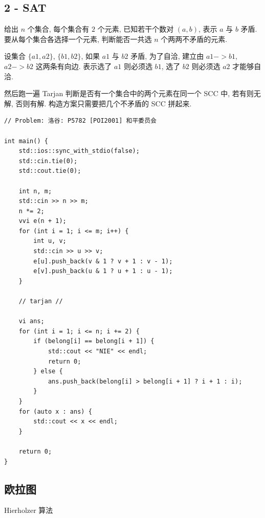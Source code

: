 \documentclass[UTF8, a4paper, titlepage, twoside]{ctexart}
\begin{document}
\subsection{ 2 - SAT }
给出 $n$ 个集合, 每个集合有 $2$ 个元素, 已知若干个数对 $(a, b)$, 表示 $a$ 与 $b$ 矛盾. 要从每个集合各选择一个元素, 判断能否一共选 $n$ 个两两不矛盾的元素. 

设集合 $\{a1, a2\}$, $\{b1, b2\}$, 如果 $a1$ 与 $b2$ 矛盾, 为了自洽, 建立由 $a1 -> b1$, $a2 -> b2$ 这两条有向边. 表示选了 $a1$ 则必须选 $b1$, 选了 $b2$ 则必须选 $a2$ 才能够自洽.

然后跑一遍 Tarjan 判断是否有一个集合中的两个元素在同一个 SCC 中, 若有则无解, 否则有解. 构造方案只需要把几个不矛盾的 SCC 拼起来.

\begin{lstlisting}[style=cpp]
// Problem: 洛谷: P5782 [POI2001] 和平委员会

int main() {
    std::ios::sync_with_stdio(false);
    std::cin.tie(0);
    std::cout.tie(0);

    int n, m;
    std::cin >> n >> m;
    n *= 2;
    vvi e(n + 1);
    for (int i = 1; i <= m; i++) {
        int u, v;
        std::cin >> u >> v;
        e[u].push_back(v & 1 ? v + 1 : v - 1);
        e[v].push_back(u & 1 ? u + 1 : u - 1);
    }

    // tarjan //
    
    vi ans;
    for (int i = 1; i <= n; i += 2) {
        if (belong[i] == belong[i + 1]) {
            std::cout << "NIE" << endl;
            return 0;
        } else {
            ans.push_back(belong[i] > belong[i + 1] ? i + 1 : i);
        }
    }
    for (auto x : ans) {
        std::cout << x << endl;
    }

    return 0;
}
\end{lstlisting}

\subsection{ 欧拉图 }
Hierholzer 算法
\end{document}
